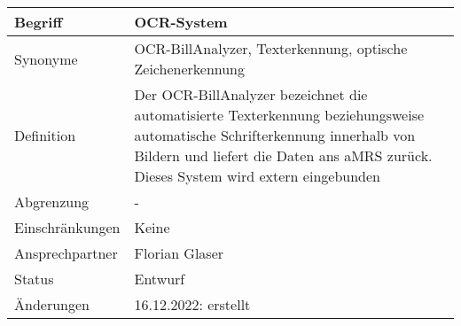 \begin{table}[H]
    \centering
    \label{gls:ocr-System}
    \begin{tabularx}{\textwidth}{| l | X |}
        \hline
        Begriff         & OCR-System                                                                                                                                                                                                       \\
        \hline
        Synonyme        & OCR-BillAnalyzer, Texterkennung, optische Zeichenerkennung                                                                                                                                                                               \\
        \hline
        Definition      & Der OCR-BillAnalyzer bezeichnet die automatisierte Texterkennung beziehungsweise automatische Schrifterkennung innerhalb von Bildern und liefert die Daten ans \ac{aMRS} zurück. Dieses System wird extern eingebunden \\
        \hline
        Abgrenzung      & -                                                                                                                                                                                                                      \\
        \hline
        Einschränkungen & Keine                                                                                                                                                                                                                  \\
        \hline
        Ansprechpartner & Florian Glaser                                                                                                                                                                                                         \\
        \hline
        Status          & Entwurf                                                                                                                                                                                                                \\
        \hline
        Änderungen      & 16.12.2022: erstellt                                                                                                                                                                                                   \\
        \hline
    \end{tabularx}
\end{table}


